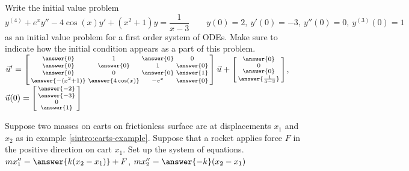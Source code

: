 \documentclass{ximera}
\begin{document}
\begin{exercise}
    Write the initial value problem 
    \[ 
        y^{(4)} + e^x y'' - 4\cos(x)y' + (x^2 + 1)y = \frac{1}{x-3} \qquad y(0) = 2,\ y'(0) = -3,\ y''(0) = 0,\ y^{(3)}(0) = 1 
    \] 
    as an initial value problem for a first order system of ODEs. Make sure to indicate how the initial condition appears as a part of this problem. \\
    $\vec{u}' = \left[\begin{smallmatrix}  \answer{0} & 1 & \answer{0} & 0 \\ \answer{0} & \answer{0} & 1 & \answer{0} \\ \answer{0} & 0 & \answer{0} & \answer{1} \\ \answer{-(x^2 + 1)} & \answer{4\cos(x)} & -e^x & \answer{0} \end{smallmatrix}\right] \vec{u} + \left[\begin{smallmatrix} \answer{0} \\ 0 \\ \answer{0} \\ \answer{\frac{1}{x-3}} \end{smallmatrix}\right]$, $\vec{u}(0) = \left[\begin{smallmatrix} \answer{-2} \\ \answer{-3} \\ 0 \\ \answer{1} \end{smallmatrix}\right]$
\end{exercise}

\begin{exercise}
    Suppose two masses on carts on frictionless surface are at displacements $x_1$ and $x_2$ as in example \ref{sintro:carts-example}. Suppose that a rocket applies force $F$ in the positive direction on cart $x_1$.  Set up the system of equations.\\
    $mx_1'' = \answer{k(x_2 - x_1)} + F$,  $mx_2'' = \answer{-k}(x_2 - x_1)$
\end{exercise}
\end{document}
